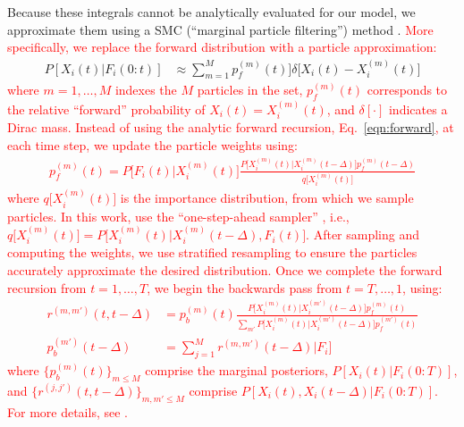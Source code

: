 \documentclass[aoas,preprint]{imsart}
\providecommand{\tr}[1]{\textcolor{red}{#1}}
\begin{document}
Because these integrals cannot be analytically evaluated for our
model, we approximate them using a SMC (``marginal particle
filtering'') method \cite{DGA00,DFG01,GDW04}.  \tr{More specifically, we replace the forward distribution with a particle approximation:}
\begin{align} \label{eqn:forward2}
P[X_i(t) | F_i(0:t)] &\approx \sum_{m=1}^M p_f^{(m)}(t)] \delta \big[X_i(t)-X_i^{(m)}(t)\big]
\end{align}
\noindent \tr{where $m=1,\ldots,M$ indexes the $M$ particles in the set, $p_f^{(m)}(t)$ corresponds to the relative ``forward'' probability of $X_i(t)=X_i^{(m)}(t)$, and $\delta[\cdot]$ indicates a Dirac mass. Instead of using the analytic forward recursion, Eq.~\eqref{eqn:forward}, at each time step, we update the particle weights using:
\begin{align}
	p_f^{(m)}(t) = P\big[F_i(t) | X_i^{(m)}(t)\big]  \frac{P\big[X_i^{(m)}(t) | X_i^{(m)}(t-\Delta)\big] p_f^{(m)}(t-\Delta)}{q\big[X_i^{(m)}(t)\big]}
\end{align}
\noindent where $q\big[X_i^{(m)}(t)\big]$ is the importance distribution, from which we sample particles.  In this work, use the ``one-step-ahead sampler'' \cite{DGA00}, i.e., $q\big[X_i^{(m)}(t)\big]=P\big[X_i^{(m)}(t) | X_i^{(m)}(t-\Delta), F_i(t)\big]$.  After sampling and computing the weights, we use stratified resampling \cite{DCM05} to ensure the particles accurately approximate the desired distribution.  Once we complete the forward recursion from $t=1,\ldots, T$, we begin the backwards pass from $t=T,\ldots, 1$, using:
\begin{align}
r^{(m,m')}(t,t-\Delta) &= p_b^{(m)}(t)
\frac{P\big[X_i^{(m)}(t) | X_i^{(m')} (t-\Delta)\big] p_f^{(m)}(t)} {\sum_{m'} P\big[X_i^{(m)}(t) | X_i^{(m')}(t-\Delta)\big] p_f^{(m')}(t)} \\
p_b^{(m')}(t-\Delta) &= \sum_{j=1}^M r^{(m,m')}(t-\Delta) | F_i\big] 
\label{eqn:backward2}
\end{align}
\noindent where $\{p_b^{(m)}(t)\}_{m\leq M}$ comprise the marginal posteriors, $P[X_i(t)|F_i(0:T)]$, and $\{r^{(j,j')}(t,t-\Delta)\}_{m,m'\leq M}$ comprise $P[X_i(t), X_i(t-\Delta) | F_i(0:T)]$. For more details, see
\cite{Vogelstein2009}.} %
\end{document}
